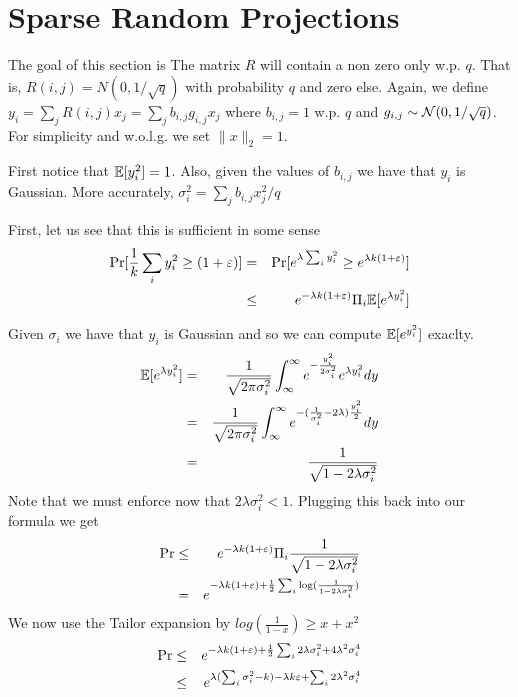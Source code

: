 \documentclass{article}
\begin{document}

\section{Sparse Random Projections}
The goal of this section is 
The matrix $R$ will contain a non zero only w.p. $q$. That is, 
$R(i,j) = N(0,1/\sqrt{q})$ with probability $q$ and zero else.
Again, we define $y_i = \sum_{j}R(i,j) x_j = \sum_{j}b_{i,j} g_{i,j} x_j$ where $b_{i,j} = 1$ w.p. $q$ and $g_{i,j} \sim {\mathcal{N}}(0,1/\sqrt{q})$.
For simplicity and w.o.l.g. we set $\|x\|_2 = 1$.

First notice that ${\mathbb E}[y^2_i]  = 1$. Also, given the values of $b_{i,j}$ we have that $y_i$ is Gaussian.
More accurately, $\sigma_{i}^2 = \sum_{j}  b_{i,j} x_{j}^{2}/q$ 

First, let us see that this is sufficient in some sense
\begin{eqnarray}
\Pr[  \frac{1}{k} \sum_{i} y_{i}^{2} \ge (1+\varepsilon)] &= &\Pr[  e^{\lambda\sum_{i} y_{i}^{2}} \ge e^{\lambda k(1+\varepsilon)}] \\
&\le & e^{-\lambda k(1+\varepsilon)}\Pi_{i}{\mathbb E} [e^{\lambda y_{i}^{2}}]
\end{eqnarray}

Given $\sigma_i$ we have that $y_{i}$ is Gaussian and so we can compute ${\mathbb E} [e^{y_{i}^{2}}]$ exaclty.
\begin{eqnarray}
{\mathbb E} [e^{\lambda y_{i}^{2}}] &=& \frac{1}{\sqrt{2\pi \sigma^2_i}}\int_{\infty}^{\infty} e^{-\frac{y_{i}^{2}}{2\sigma^{2}_{i}}} e^{\lambda y_{i}^{2}} dy\\
&=& \frac{1}{\sqrt{2\pi\sigma^2_i}}\int_{\infty}^{\infty} e^{-(\frac{1}{\sigma^2_i}- 2\lambda)\frac{y_{i}^{2}}{2}} dy\\
&=& \frac{1}{\sqrt{1-2\lambda \sigma^{2}_{i}}}
\end{eqnarray}
Note that we must enforce now that $2\lambda \sigma^2_i < 1$.
Plugging this back into our formula we get 
\begin{eqnarray}
\Pr &\le& e^{-\lambda k(1+\varepsilon)}\Pi_{i}\frac{1}{\sqrt{1-2\lambda \sigma^{2}_{i}}}\\
&= &e^{-\lambda k(1+\varepsilon)  + \frac{1}{2} \sum_{i}\log(\frac{1}{1-2\lambda \sigma^{2}_{i}})   }
\end{eqnarray}
We now use the Tailor expansion by $log(\frac{1}{1-x}) \ge x + x^2$
\begin{eqnarray}
\Pr &\le& e^{-\lambda k(1+\varepsilon)  + \frac{1}{2} \sum_{i} 2\lambda \sigma^{2}_{i}   + 4\lambda^2 \sigma^{4}_{i}}\\
&\le& e^{ \lambda (\sum_{i} \sigma^{2}_{i} - k) - \lambda k \varepsilon  + \sum_{i} 2\lambda^2 \sigma^{4}_{i}}\\
\end{eqnarray}
\end{document}
